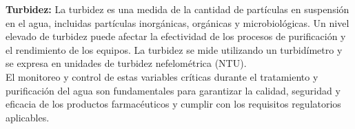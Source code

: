 \textbf{Turbidez:} La turbidez es una medida de la cantidad de partículas en suspensión en el agua, incluidas partículas inorgánicas, orgánicas y microbiológicas. Un nivel elevado de turbidez puede afectar la efectividad de los procesos de purificación y el rendimiento de los equipos. La turbidez se mide utilizando un turbidímetro y se expresa en unidades de turbidez nefelométrica (NTU).\\

El monitoreo y control de estas variables críticas durante el tratamiento y purificación del agua son fundamentales para garantizar la calidad, seguridad y eficacia de los productos farmacéuticos y cumplir con los requisitos regulatorios aplicables.\\
